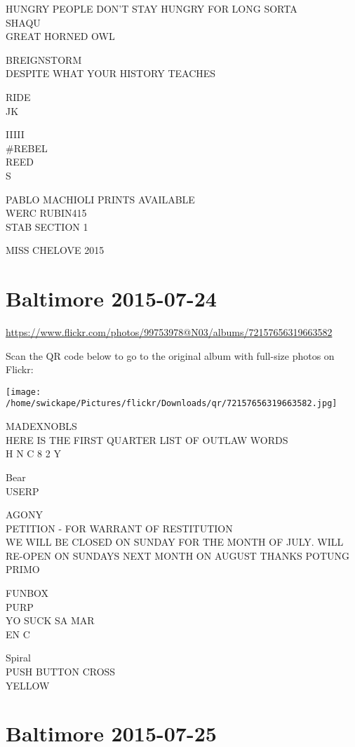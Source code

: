 \documentclass[10pt,letterpaper]{article}
\begin{document}
HUNGRY PEOPLE DON'T STAY HUNGRY FOR LONG SORTA\\
SHAQU\\
GREAT HORNED OWL

BREIGNSTORM\\
DESPITE WHAT YOUR HISTORY TEACHES

RIDE\\
JK

IIIII\\
\#REBEL\\
REED\\
S

PABLO MACHIOLI PRINTS AVAILABLE\\
WERC RUBIN415\\
STAB SECTION 1

MISS CHELOVE 2015


\section*{Baltimore 2015-07-24}

\url{https://www.flickr.com/photos/99753978@N03/albums/72157656319663582}

Scan the QR code below to go to the original album with full-size photos on Flickr:

\texttt{[image: /home/swickape/Pictures/flickr/Downloads/qr/72157656319663582.jpg]}


MADEXNOBLS\\
HERE IS THE FIRST QUARTER LIST OF OUTLAW WORDS\\
H N C 8 2 Y

Bear\\
USERP

AGONY\\
PETITION {-} FOR WARRANT OF RESTITUTION\\
WE WILL BE CLOSED ON SUNDAY FOR THE MONTH OF JULY.  WILL RE{-}OPEN ON SUNDAYS NEXT MONTH ON AUGUST THANKS POTUNG\\
PRIMO

FUNBOX\\
PURP\\
YO SUCK SA MAR\\
EN C

Spiral\\
PUSH BUTTON CROSS\\
YELLOW


\section*{Baltimore 2015-07-25}
\end{document}
